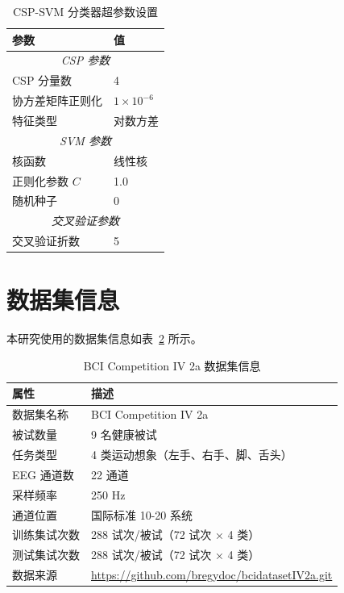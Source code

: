 \begin{table}[H]
\centering
\caption{CSP-SVM 分类器超参数设置}
\label{tab:csp_svm_params}
\begin{tabular}{ll}
\hline
\textbf{参数} & \textbf{值} \\
\hline
\multicolumn{2}{c}{\textit{CSP 参数}} \\
\hline
CSP 分量数 & 4 \\
协方差矩阵正则化 & $1 \times 10^{-6}$ \\
特征类型 & 对数方差 \\
\hline
\multicolumn{2}{c}{\textit{SVM 参数}} \\
\hline
核函数 & 线性核 \\
正则化参数 $C$ & 1.0 \\
随机种子 & 0 \\
\hline
\multicolumn{2}{c}{\textit{交叉验证参数}} \\
\hline
交叉验证折数 & 5 \\
\hline
\end{tabular}
\end{table}

\section{数据集信息}
\label{sec:dataset_info}

本研究使用的数据集信息如表~\ref{tab:dataset_info} 所示。

\begin{table}[H]
\centering
\caption{BCI Competition IV 2a 数据集信息}
\label{tab:dataset_info}
\begin{tabular}{ll}
\hline
\textbf{属性} & \textbf{描述} \\
\hline
数据集名称 & BCI Competition IV 2a \\
被试数量 & 9 名健康被试 \\
任务类型 & 4 类运动想象（左手、右手、脚、舌头） \\
EEG 通道数 & 22 通道 \\
采样频率 & 250 Hz \\
通道位置 & 国际标准 10-20 系统 \\
训练集试次数 & 288 试次/被试（72 试次 × 4 类） \\
测试集试次数 & 288 试次/被试（72 试次 × 4 类） \\
数据来源 & \url{https://github.com/bregydoc/bcidatasetIV2a.git} \\
\hline
\end{tabular}
\end{table}

